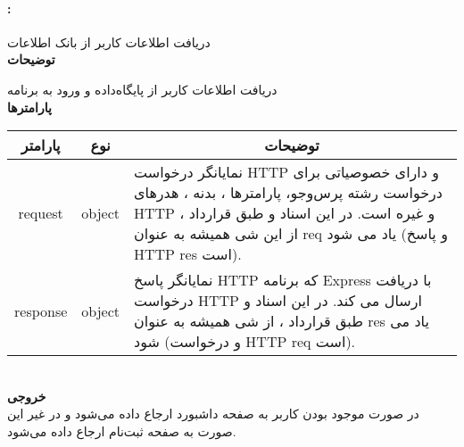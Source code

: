 \paragraph{:}
دریافت اطلاعات کاربر از بانک اطلاعات
\\
\textbf{توضیحات}
\hr
\begin{flushleft}
	\framebox[.9\textwidth][l]{
		\lr{
			\textcolor{type}{void}
			\textcolor{func}{postLogIn}
			\textcolor{symb}{(}
			\textcolor{type}{object}
			\textcolor{arg}{request}
			\textcolor{symb}{,}
			\textcolor{type}{object}
			\textcolor{arg}{response}
			\textcolor{symb}{);}
		}
	}
\end{flushleft}
دریافت اطلاعات کاربر از پایگاه‌داده و ورود به برنامه
\\
\textbf{پارامترها}
\hr \\[10pt]
\begin{tabular}{|m{4cm}|m{3cm}|m{10cm}|}
	\hline
	\multicolumn{1}{|c}{پارامتر}
	&
	\multicolumn{1}{|c}{نوع}
	&
	\multicolumn{1}{|c|}{توضیحات}
	\\
	\hline
	\multicolumn{1}{|c}{request}
	&
	\multicolumn{1}{|c|}{object}
	&
	نمایانگر درخواست HTTP و دارای خصوصیاتی برای درخواست رشته پرس‌و‌جو، پارامترها ، بدنه ، هدرهای HTTP و غیره است.
	در این اسناد و طبق قرارداد ، از این شی همیشه به عنوان req یاد می شود (و پاسخ HTTP res است).
	\\
	\hline
	\multicolumn{1}{|c}{response}
	&
	\multicolumn{1}{|c|}{object}
	&
	نمایانگر پاسخ HTTP که برنامه Express با دریافت درخواست HTTP ارسال می کند.
	در این اسناد و طبق قرارداد ، از شی همیشه به عنوان res یاد می شود (و درخواست HTTP req است).
	\\
	\hline
\end{tabular}
\\[10pt]
\textbf{خروجی}
\hr \\
در صورت موجود بودن کاربر به صفحه داشبورد ارجاع داده می‌شود و در غیر این صورت به صفحه ثبت‌نام ارجاع داده می‌شود.


